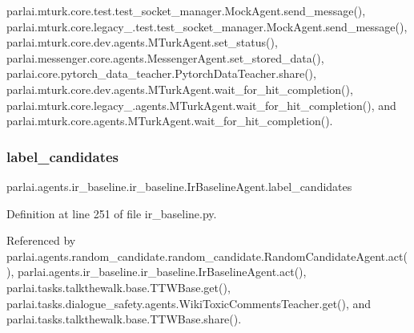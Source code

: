 parlai.\+mturk.\+core.\+test.\+test\+\_\+socket\+\_\+manager.\+Mock\+Agent.\+send\+\_\+message(), parlai.\+mturk.\+core.\+legacy\+\_.\+test.\+test\+\_\+socket\+\_\+manager.\+Mock\+Agent.\+send\+\_\+message(), parlai.\+mturk.\+core.\+dev.\+agents.\+M\+Turk\+Agent.\+set\+\_\+status(), parlai.\+messenger.\+core.\+agents.\+Messenger\+Agent.\+set\+\_\+stored\+\_\+data(), parlai.\+core.\+pytorch\+\_\+data\+\_\+teacher.\+Pytorch\+Data\+Teacher.\+share(), parlai.\+mturk.\+core.\+dev.\+agents.\+M\+Turk\+Agent.\+wait\+\_\+for\+\_\+hit\+\_\+completion(), parlai.\+mturk.\+core.\+legacy\+\_.\+agents.\+M\+Turk\+Agent.\+wait\+\_\+for\+\_\+hit\+\_\+completion(), and parlai.\+mturk.\+core.\+agents.\+M\+Turk\+Agent.\+wait\+\_\+for\+\_\+hit\+\_\+completion().

\mbox{\label{classparlai_1_1agents_1_1ir__baseline_1_1ir__baseline_1_1IrBaselineAgent_aa7619e8bcb4c75322f0ce7ac9a6cb860}} 
\subsubsection{\texorpdfstring{label\+\_\+candidates}{label\_candidates}}
{\footnotesize\ttfamily parlai.\+agents.\+ir\+\_\+baseline.\+ir\+\_\+baseline.\+Ir\+Baseline\+Agent.\+label\+\_\+candidates}



Definition at line 251 of file ir\+\_\+baseline.\+py.



Referenced by parlai.\+agents.\+random\+\_\+candidate.\+random\+\_\+candidate.\+Random\+Candidate\+Agent.\+act(), parlai.\+agents.\+ir\+\_\+baseline.\+ir\+\_\+baseline.\+Ir\+Baseline\+Agent.\+act(), parlai.\+tasks.\+talkthewalk.\+base.\+T\+T\+W\+Base.\+get(), parlai.\+tasks.\+dialogue\+\_\+safety.\+agents.\+Wiki\+Toxic\+Comments\+Teacher.\+get(), and parlai.\+tasks.\+talkthewalk.\+base.\+T\+T\+W\+Base.\+share().

\mbox{\label{classparlai_1_1agents_1_1ir__baseline_1_1ir__baseline_1_1IrBaselineAgent_a766788ecf47ab2d015b92dc2c9c191e3}} 
